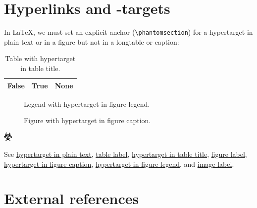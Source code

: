 \documentclass[a4paper]{article}
\newlength{\DUtablewidth} %
\newenvironment{DUlegend}{\small}{}
\begin{document}
\section{Hyperlinks and -targets%
  \label{hyperlinks-and-targets}%
}

In LaTeX, we must set an explicit anchor (\texttt{\textbackslash{}phantomsection}) for a
%
\label{hypertarget-in-plain-text}hypertarget in plain text or in a figure but not in a longtable or
caption:

\setlength{\DUtablewidth}{\linewidth}%
\begin{longtable}{|p{0.075\DUtablewidth}|p{0.075\DUtablewidth}|p{0.075\DUtablewidth}|}
\caption{Table with %
\label{hypertarget-in-table-title}hypertarget in table title.}\\
\hline

False
 & 
True
 & 
None
 \\
\hline
\end{longtable}
\label{table-label}

\begin{figure}
\label{figure-label}
\noindent{}
\caption{Figure with %
\label{hypertarget-in-figure-caption}hypertarget in figure caption.}
\begin{DUlegend}
Legend with %
\label{hypertarget-in-figure-legend}hypertarget in figure legend.
\end{DUlegend}
\end{figure}

\includegraphics{../../../docs/user/rst/images/biohazard.png}
\label{image-label}

See \hyperref[hypertarget-in-plain-text]{hypertarget in plain text},
\hyperref[table-label]{table label}, \hyperref[hypertarget-in-table-title]{hypertarget in table title},
\hyperref[figure-label]{figure label}, \hyperref[hypertarget-in-figure-caption]{hypertarget in figure caption},
\hyperref[hypertarget-in-figure-legend]{hypertarget in figure legend}, and
\hyperref[image-label]{image label}.


\section{External references%
  \label{external-references}%
}
\end{document}
